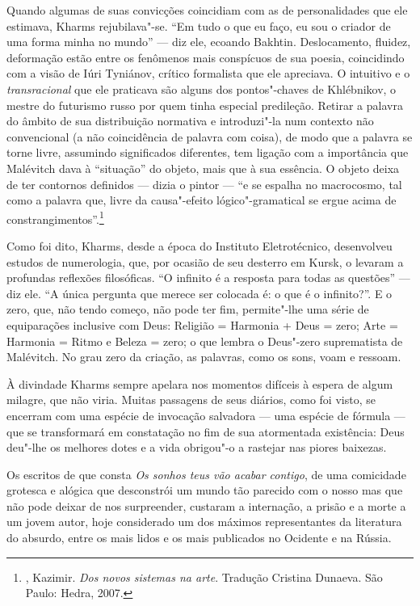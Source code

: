 Quando algumas de suas convicções coincidiam com as de personalidades
que ele estimava, Kharms rejubilava"-se. ``Em tudo o que eu faço, eu sou
o criador de uma forma minha no mundo'' --- diz ele, ecoando Bakhtin.
Deslocamento, fluidez, deformação estão entre os fenômenos mais
conspícuos de sua poesia, coincidindo com a visão de Iúri Tyniánov,
crítico formalista que ele apreciava. O intuitivo e o
\emph{transracional} que ele praticava são alguns dos pontos"-chaves de
Khlébnikov, o mestre do futurismo russo por quem tinha especial
predileção. Retirar a palavra do âmbito de sua distribuição normativa e
introduzi"-la num contexto não convencional (a não coincidência de
palavra com coisa), de modo que a palavra se torne livre, assumindo
significados diferentes, tem ligação com a importância que Malévitch
dava à ``situação'' do objeto, mais que à sua essência. O objeto deixa
de ter contornos definidos --- dizia o pintor --- ``e se espalha no
macrocosmo, tal como a palavra que, livre da causa"-efeito
lógico"-gramatical se ergue acima de constrangimentos''.\footnote{, Kazimir. \emph{Dos novos sistemas na arte}. Tradução Cristina Dunaeva. São Paulo: Hedra, 2007.}

Como foi dito, Kharms, desde a época do Instituto Eletrotécnico,
desenvolveu estudos de numerologia, que, por ocasião de seu desterro em
Kursk, o levaram a profundas reflexões filosóficas. ``O infinito é a
resposta para todas as questões'' --- diz ele. ``A única pergunta que
merece ser colocada é: o que é o infinito?''. E o zero, que, não tendo
começo, não pode ter fim, permite"-lhe uma série de equiparações
inclusive com Deus: Religião = Harmonia + Deus = zero; Arte = Harmonia =
Ritmo e Beleza = zero; o que lembra o Deus"-zero suprematista de
Malévitch. No grau zero da criação, as palavras, como os sons, voam e
ressoam.

À divindade Kharms sempre apelara nos momentos difíceis à espera de
algum milagre, que não viria. Muitas passagens de seus diários, como foi
visto, se encerram com uma espécie de invocação salvadora --- uma espécie
de fórmula --- que se transformará em constatação no fim de sua
atormentada existência: Deus deu"-lhe os melhores dotes e a vida
obrigou"-o a rastejar nas piores baixezas.

Os escritos de que consta \emph{Os sonhos teus vão acabar contigo}, de uma comicidade grotesca e
alógica que desconstrói um mundo tão parecido com o nosso mas que não
pode deixar de nos surpreender, custaram a internação, a prisão e a
morte a um jovem autor, hoje considerado um dos máximos representantes
da literatura do absurdo, entre os mais lidos e os mais publicados no
Ocidente e na Rússia.



